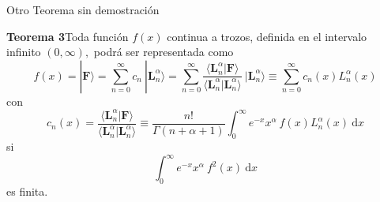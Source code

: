 \documentclass[spanish,notitlepage,letterpaper,12pt]{article}
\begin{document}
Otro Teorema sin demostraci\'{o}n

\textbf{Teorema 3}\newline Toda funci\'{o}n $f(x)$ continua a trozos, definida
en el intervalo infinito $\left(  0,\infty\right)  ,$ podr\'{a} ser
representada como
\[
f(x)=|\mathbf{F}\rangle=\sum_{n=0}^{\infty}c_{n}\ |\mathbf{L}_{n}^{\alpha
}\rangle=\sum_{n=0}^{\infty}\frac{\langle\mathbf{L}_{n}^{\alpha}%
|\mathbf{F}\rangle}{\langle\mathbf{L}_{n}^{\alpha}|\mathbf{L}_{n}^{\alpha
}\rangle}\ |\mathbf{L}_{n}^{\alpha}\rangle\equiv\sum_{n=0}^{\infty}%
c_{n}(x)L_{n}^{\alpha}(x)
\]
con
\[
c_{n}(x)=\frac{\langle\mathbf{L}_{n}^{\alpha}|\mathbf{F}\rangle}%
{\langle\mathbf{L}_{n}^{\alpha}|\mathbf{L}_{n}^{\alpha}\rangle}\equiv
\dfrac{n!}{\Gamma\left(  n+\alpha+1\right)  }%
{\displaystyle\int_{0}^{\infty}}
e^{-x}x^{\alpha}\ f(x)L_{n}^{\alpha}(x)\ \mathrm{d}x
\]
si
\[%
{\displaystyle\int_{0}^{\infty}}
e^{-x}x^{\alpha}\ f^{2}(x)\ \mathrm{d}x
\]
es finita.
\end{document}
